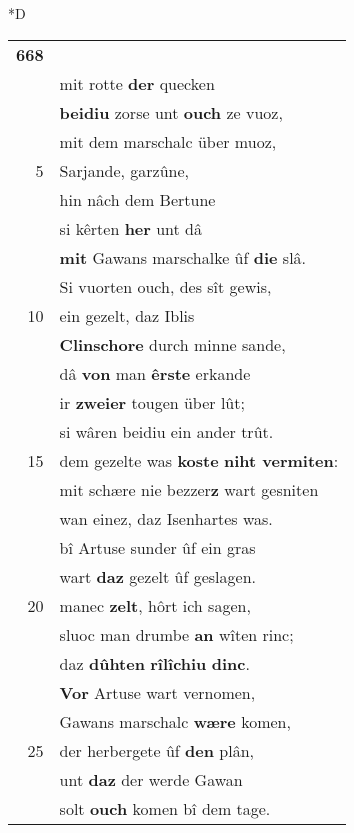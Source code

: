 \documentclass[8pt,a4paper,notitlepage]{article}
\begin{document}
\begin{table}[ht]
\begin{minipage}[t]{0.5\linewidth}
\small
\begin{center}*D
\end{center}
\begin{tabular}{rl}
\textbf{668} & \textit{\begin{large}S\end{large}}eytiez unt snecken,\\ 
 & mit rotte \textbf{der} quecken\\ 
 & \textbf{beidiu} zorse unt \textbf{ouch} ze vuoz,\\ 
 & mit dem marschalc über muoz,\\ 
5 & Sarjande, garzûne,\\ 
 & hin nâch dem Bertune\\ 
 & si kêrten \textbf{her} unt dâ\\ 
 & \textbf{mit} Gawans marschalke ûf \textbf{die} slâ.\\ 
 & Si vuorten ouch, des sît gewis,\\ 
10 & ein gezelt, daz Iblis\\ 
 & \textbf{Clinschore} durch minne sande,\\ 
 & dâ \textbf{von} man \textbf{êrste} erkande\\ 
 & ir \textbf{zweier} tougen über lût;\\ 
 & si wâren beidiu ein ander trût.\\ 
15 & dem gezelte was \textbf{koste} \textbf{niht vermiten}:\\ 
 & mit schære nie bezzer\textbf{z} wart gesniten\\ 
 & wan einez, daz Isenhartes was.\\ 
 & bî Artuse sunder ûf ein gras\\ 
 & wart \textbf{daz} gezelt ûf geslagen.\\ 
20 & manec \textbf{zelt}, hôrt ich sagen,\\ 
 & sluoc man drumbe \textbf{an} wîten rinc;\\ 
 & daz \textbf{dûhten} \textbf{rîlîchiu} \textbf{dinc}.\\ 
 & \textbf{Vor} Artuse wart vernomen,\\ 
 & Gawans marschalc \textbf{wære} komen,\\ 
25 & der herbergete ûf \textbf{den} plân,\\ 
 & unt \textbf{daz} der werde Gawan\\ 
 & solt \textbf{ouch} komen bî dem tage.\\ 

\end{tabular}
\end{minipage}
\end{table}
\end{document}
